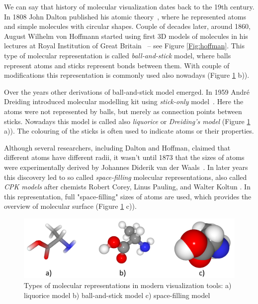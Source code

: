We can say that history of molecular visualization dates back to the 19th century. In 1808 John Dalton published his atomic theory~\cite{dalton1808new}, where he represented atoms and simple molecules with circular shapes. Couple of decades later, around 1860, August Wilhelm von Hoffmann started using first 3D models of molecules in his lectures at Royal Institution of Great Britain~\cite{perkins2005history} -- see Figure \ref{Fig:hoffman}. This type of molecular representation is called \textit{ball-and-stick} model, where balls represent atoms and sticks represent bonds between them. With couple of modifications this representation is commonly used also nowadays (Figure \ref{Fig:vis} b)). 

Over the years other derivations of ball-and-stick model emerged. In 1959 André Dreiding introduced molecular modelling kit using \textit{stick-only} model~\cite{dreiding1959einfache}. Here the atoms were not represented by balls, but merely as connection points between sticks. Nowadays this model is called also \textit{liquorice} or \textit{Dreiding's model} (Figure \ref{Fig:vis} a)). The colouring of the sticks is often used to indicate atoms or their properties.

Although several researchers, including Dalton and Hoffman, claimed that different atoms have different radii, it wasn't until 1873 that the sizes of atoms were experimentally derived by Johannes Diderik van der Waals~\cite{Waals1873PhDThesis}. In later years this discovery led to so called \textit{space-filling} molecular representations, also called \textit{CPK models} after chemists Robert Corey, Linus Pauling, and Walter Koltun \cite{corey1953molecular}. In this representation, full "space-filling" sizes of atoms are used, which provides the overview of molecular surface (Figure \ref{Fig:vis} c)).

\begin{figure}[H]
  \centering
  \includegraphics[width=0.8\linewidth]{pictures/vis.pdf} 
  \caption{Types of molecular representations in modern visualization tools: a) liquorice model b) ball-and-stick model c) space-filling model}
  \label{Fig:vis}  
\end{figure} 

